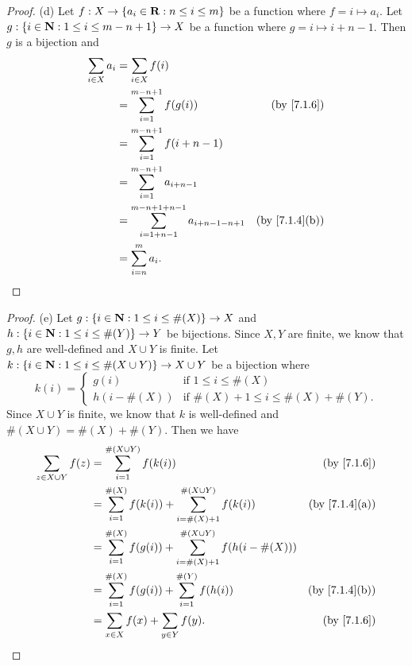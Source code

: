 \begin{proof}{(d)}
  Let \(f : X \to \{a_i \in \mathbf{R} : n \leq i \leq m\}\) be a function where \(f = i \mapsto a_i\).
  Let \(g : \{i \in \mathbf{N} : 1 \leq i \leq m - n + 1\} \to X\) be a function where \(g = i \mapsto i + n - 1\).
  Then \(g\) is a bijection and
  \begin{align*}
    \sum_{i \in X} a_i & = \sum_{i \in X} f(i)                                                                          \\
                       & = \sum_{i = 1}^{m - n + 1} f(g(i))                               & \text{(by \cref{7.1.6})}    \\
                       & = \sum_{i = 1}^{m - n + 1} f(i + n - 1)                                                        \\
                       & = \sum_{i = 1}^{m - n + 1} a_{i + n - 1}                                                       \\
                       & = \sum_{i = 1 + n - 1}^{m - n + 1 + n - 1} a_{i + n - 1 - n + 1} & \text{(by \cref{7.1.4}(b))} \\
                       & = \sum_{i = n}^m a_i.
  \end{align*}
\end{proof}

\begin{proof}{(e)}
  Let \(g : \{i \in \mathbf{N} : 1 \leq i \leq \#(X)\} \to X\) and \(h : \{i \in \mathbf{N} : 1 \leq i \leq \#(Y)\} \to Y\) be bijections.
  Since \(X, Y\) are finite, we know that \(g, h\) are well-defined and \(X \cup Y\) is finite.
  Let \(k : \{i \in \mathbf{N} : 1 \leq i \leq \#(X \cup Y)\} \to X \cup Y\) be a bijection where
  \[
    k(i) = \begin{cases}
      g(i)         & \text{if } 1 \leq i \leq \#(X)                  \\
      h(i - \#(X)) & \text{if } \#(X) + 1 \leq i \leq \#(X) + \#(Y).
    \end{cases}
  \]
  Since \(X \cup Y\) is finite, we know that \(k\) is well-defined and \(\#(X \cup Y) = \#(X) + \#(Y)\).
  Then we have
  \begin{align*}
    \sum_{z \in X \cup Y} f(z) & = \sum_{i = 1}^{\#(X \cup Y)} f(k(i))                                                & \text{(by \cref{7.1.6})}    \\
                               & = \sum_{i = 1}^{\#(X)} f(k(i)) + \sum_{i = \#(X) + 1}^{\#(X \cup Y)} f(k(i))         & \text{(by \cref{7.1.4}(a))} \\
                               & = \sum_{i = 1}^{\#(X)} f(g(i)) + \sum_{i = \#(X) + 1}^{\#(X \cup Y)} f(h(i - \#(X)))                               \\
                               & = \sum_{i = 1}^{\#(X)} f(g(i)) + \sum_{i = 1}^{\#(Y)} f(h(i))                        & \text{(by \cref{7.1.4}(b))} \\
                               & = \sum_{x \in X} f(x) + \sum_{y \in Y} f(y).                                         & \text{(by \cref{7.1.6})}
  \end{align*}
\end{proof}

